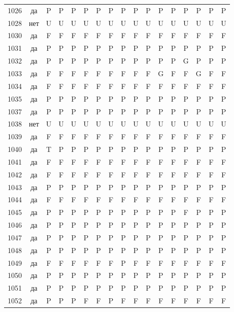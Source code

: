 \begin{table}[p]
\begin{tabular*}{\textwidth}{@{\extracolsep{\fill}}rcccccccccccccccc}
1026 & да & P & P & P & P & P & P & P & P & P & P & P & P & P & P & P\\
1028 & нет & U & U & U & U & U & U & U & U & U & U & U & U & U & U & U\\
1030 & да & F & F & F & F & F & F & F & F & F & F & F & F & F & F & F\\
1031 & да & P & P & P & P & P & P & P & P & P & P & P & P & P & P & P\\
1032 & да & P & P & P & P & P & P & P & P & P & P & P & G & P & P & P\\
1033 & да & F & F & F & F & F & F & F & F & F & G & F & F & G & F & F\\
1034 & да & F & F & F & F & F & F & F & F & F & F & F & F & F & F & F\\
1035 & да & P & P & P & P & P & P & P & P & P & P & P & P & P & P & P\\
1037 & да & P & P & P & P & P & P & P & P & P & P & P & P & P & P & P\\
1038 & нет & U & U & U & U & U & U & U & U & U & U & U & U & U & U & U\\
1039 & да & F & F & F & F & F & F & F & F & F & F & F & F & F & F & F\\
1040 & да & T & P & P & P & P & P & P & P & P & P & P & P & P & P & P\\
1041 & да & F & F & F & F & F & F & F & F & F & F & F & F & F & F & F\\
1042 & да & F & F & F & F & F & F & F & F & F & F & F & F & F & F & F\\
1043 & да & P & P & P & P & P & P & P & P & P & P & P & P & P & P & P\\
1044 & да & F & F & F & F & F & F & F & F & F & F & F & F & F & F & F\\
1045 & да & P & P & P & P & P & P & P & P & P & P & P & F & P & P & P\\
1046 & да & P & P & P & P & P & P & P & P & P & P & P & P & P & P & P\\
1047 & да & P & P & P & P & P & P & P & P & P & P & P & P & P & P & P\\
1048 & да & P & P & P & P & P & P & P & P & P & P & P & P & P & P & P\\
1049 & да & F & F & F & F & F & F & P & F & F & F & F & F & F & F & F\\
1050 & да & P & P & P & P & P & P & P & P & P & P & P & P & P & P & P\\
1051 & да & P & P & P & P & P & P & P & P & P & P & P & P & P & P & P\\
1052 & да & P & P & P & F & F & P & F & F & F & F & F & F & F & F & F\\
\bottomrule\end{tabular*}\end{table}
\clearpage

